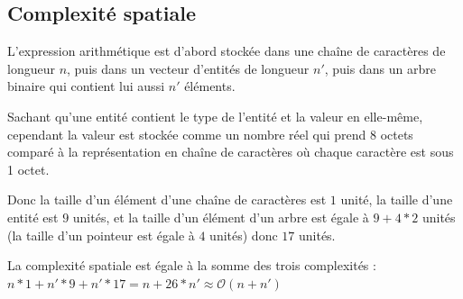 \subsection{Complexité spatiale}
L'expression arithmétique est d'abord stockée dans une chaîne de caractères de longueur $n$, puis dans un vecteur d'entités de longueur $n'$, puis dans un arbre binaire qui contient lui aussi $n'$ éléments.
\par
Sachant qu'une entité contient le type de l'entité et la valeur en elle-même, cependant la valeur est stockée comme un nombre réel qui prend 8 octets comparé à la représentation en chaîne de caractères où chaque caractère est sous 1 octet.
\par
Donc la taille d'un élément d'une chaîne de caractères est $1$ unité, la taille d'une entité est $9$ unités, et la taille d'un élément d'un arbre est égale à $9 + 4 * 2$ unités (la taille d'un pointeur est égale à $4$ unités) donc $17$ unités.
\par
La complexité spatiale est égale à la somme des trois complexités : $n * 1 + n' * 9 + n' * 17 = n + 26 * n' \approx \mathcal{O}(n + n')$
\par

